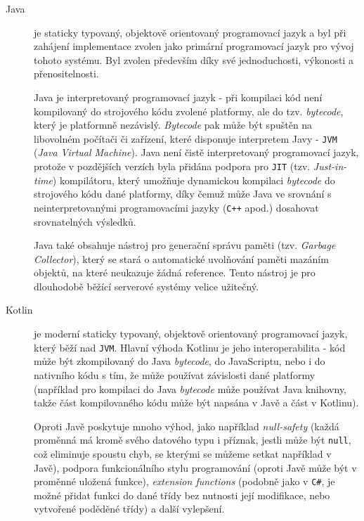 \begin{description}
    \item[Java] je staticky typovaný, objektově orientovaný programovací jazyk a byl při zahájení implementace zvolen jako primární programovací jazyk pro vývoj tohoto systému. Byl zvolen především díky své jednoduchosti, výkonosti a přenositelnosti. 
    
    Java je interpretovaný programovací jazyk - při kompilaci kód není kompilovaný do strojového kódu zvolené platformy, ale do tzv. \textit{bytecode}, který je platformně nezávislý. \textit{Bytecode} pak může být spuštěn na libovolném počítači či zařízení, které disponuje interpretem Javy - \texttt{JVM} (\textit{Java Virtual Machine}). Java není čistě interpretovaný programovací jazyk, protože v pozdějších verzích byla přidána podpora pro \texttt{JIT} (tzv. \textit{Just-in-time}) kompilátoru, který umožňuje dynamickou kompilaci \textit{bytecode} do strojového kódu dané platformy, díky čemuž může Java ve srovnání s neinterpretovanými programovacími jazyky (\texttt{C++} apod.) dosahovat srovnatelných výsledků.
    
    Java také obsahuje nástroj pro generační správu paměti (tzv. \textit{Garbage Collector}), který se stará o automatické uvolňování paměti mazáním objektů, na které neukazuje žádná reference. Tento nástroj je pro dlouhodobě běžící serverové systémy velice užitečný.

    \item[Kotlin]\label{chap:arch:technologie:kotlin} je moderní staticky typovaný, objektově orientovaný programovací jazyk, který běží nad \texttt{JVM}. Hlavní výhoda Kotlinu je jeho interoperabilita - kód může být zkompilovaný do Java \textit{bytecode}, do JavaScriptu, nebo i do nativního kódu s tím, že může používat závislosti dané platformy (například pro kompilaci do Java \textit{bytecode} může používat Java knihovny, takže část kompilovaného kódu může být napsána v Javě a část v Kotlinu).

    Oproti Javě poskytuje mnoho výhod, jako například \textit{null-safety} (každá proměnná má kromě svého datového typu i příznak, jestli může být \texttt{null}, což eliminuje spoustu chyb, se kterými se můžeme setkat například v Javě), podpora funkcionálního stylu programování (oproti Javě může být v proměnné uložená funkce), \textit{extension functions} (podobně jako v \texttt{C\#}, je možné přidat funkci do dané třídy bez nutnosti její modifikace, nebo vytvořené poděděné třídy) a další vylepšení. 
    

\end{description}
